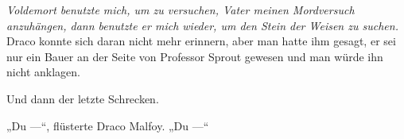 \emph{Voldemort benutzte mich, um zu versuchen, Vater meinen Mordversuch anzuhängen, dann benutzte er mich wieder, um den Stein der Weisen zu suchen.}
Draco konnte sich daran nicht mehr erinnern, aber man hatte ihm gesagt, er sei nur ein Bauer an der Seite von Professor Sprout gewesen und man würde ihn nicht anklagen.

Und dann der letzte Schrecken.

„Du —“, flüsterte Draco Malfoy.
„Du —“


